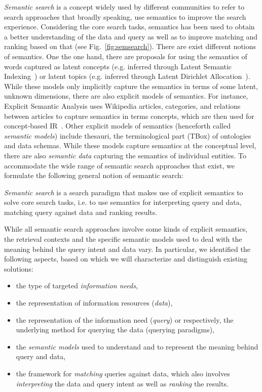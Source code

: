 \emph{Semantic search} is a concept widely used by different communities to refer to search approaches that broadly speaking, use semantics to improve the search experience. Considering the core search tasks, semantics has been used to obtain a better understanding of the data and query as well as to improve matching and ranking based on that (see Fig.~\ref{fig:semsearch}). There are exist different notions of semantics. One the one hand, there are proposals for using the semantics of words captured as latent concepts (e.g. inferred through Latent Semantic Indexing~\cite{DBLP:conf/sigir/Hofmann99}) or latent topics (e.g. inferred through Latent Dirichlet Allocation~\cite{DBLP:conf/sigir/WeiC06}). While these models only implicitly capture the semantics in terms of some latent, unknown dimensions, there are also explicit models of semantics. For instance, Explicit Semantic Analysis uses Wikipedia articles, categories, and relations between articles to capture semantics in terms concepts, which are then used for concept-based IR~\cite{DBLP:journals/tois/EgoziMG11}. Other explicit models of semantics (henceforth called \emph{semantic models}) include thesauri, the terminological part (TBox) of ontologies and data schemas. While these models capture semantics at the conceptual level, there are also \emph{semantic data} capturing the semantics of individual entities. To accommodate the wide range of semantic search approaches that exist, we formulate the following general notion of semantic search:

\begin{definition} \emph{Semantic search} is a search paradigm that makes use of explicit semantics to solve core search tasks, i.e. to use semantics for interpreting query and data, matching query against data and ranking results. 
\end{definition}

While all semantic search approaches involve some kinds of explicit semantics, the retrieval contexts and the specific semantic models used to deal with the meaning behind the query intent and data vary. In particular, we identified the following aspects, based on which we will characterize and distinguish existing solutions:

\begin{itemize}
\item the type of targeted \emph{information needs},  
\item the representation of information resources (\emph{data}), 
\item the representation of the information need (\textit{query}) or respectively, the underlying method for querying the data (querying paradigms), 
\item the \emph{semantic models} used to understand and to represent the meaning behind query and data, 
\item the framework for \emph{matching} queries against data, which also involves \emph{interpreting} the data and query intent as well as \emph{ranking} the results.  
\end{itemize}

